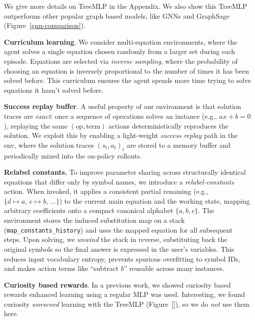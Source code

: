\documentclass{article}
\theoremstyle{plain}
\theoremstyle{definition}
\theoremstyle{remark}
\begin{document}
We give more details on TreeMLP in the Appendix. We also show this TreeMLP outperforms other popular graph based models, like GNNs and GraphSage (Figure~\ref{gnn-comparison}). 

\textbf{Curriculum learning}. We consider multi-equation environments, where the agent solves a single equation chosen randomly from a larger set during each episode. Equations are selected via \textit{inverse sampling}, where the probability of choosing an equation is inversely proportional to the number of times it has been solved before. This curriculum ensures the agent spends more time trying to solve equations it hasn't solved before.

\textbf{Success replay buffer}. A useful property of our environment is that solution traces are \emph{exact}: once a sequence of operations solves an instance (e.g., $ax+b=0$), replaying the same $(\text{op},\text{term})$ actions deterministically reproduces the solution. We exploit this by enabling a light-weight \emph{success replay} path in the env, where the solution traces $(s_t, a_t)_t$ are stored to a memory buffer and periodically mixed into the on-policy rollouts.

\textbf{Relabel constants.} To improve parameter sharing across structurally identical equations that differ only by symbol names, we introduce a \emph{relabel-constants} action.
When invoked, it applies a consistent partial renaming (e.g., $\{d\!\mapsto\!a,\, e\!\mapsto\!b,\, \dots\}$) to the current main equation and the working state, mapping arbitrary coefficients onto a compact canonical alphabet $\{a,b,c\}$. The environment stores the induced substitution map on a stack (\texttt{map\_constants\_history}) and uses the mapped equation for all subsequent steps. Upon solving, we \emph{unwind} the stack in reverse, substituting back the original symbols so the final answer is expressed in the user’s variables. This reduces input vocabulary entropy, prevents spurious overfitting to symbol IDs, and makes action terms like ``subtract $b$'' reusable across many instances.

\textbf{Curiosity based rewards}. In a previous work, we showed curiosity based rewards enhanced learning \cite{} using a regular MLP was used. Interesting, we found curiosity \textit{worsened} learning with the TreeMLP (Figure~\ref{}), so we do \textit{not} use them here.

\end{document}
